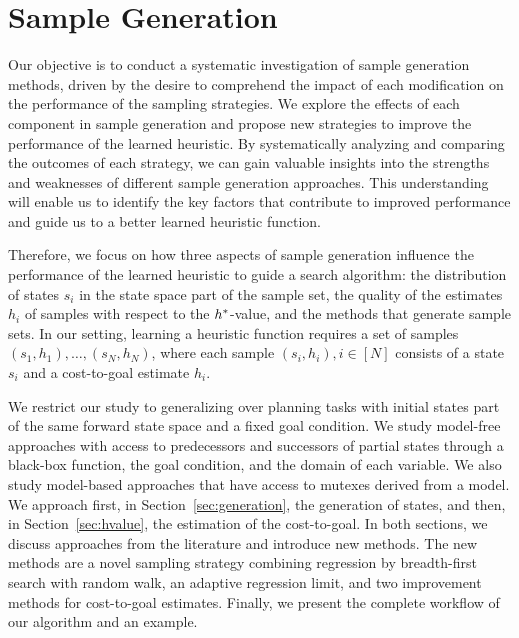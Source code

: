 \chapter{Sample Generation}
\label{sec:sampling}

Our objective is to conduct a systematic investigation of sample generation methods, driven by the desire to comprehend the impact of each modification on the performance of the sampling strategies. We explore the effects of each component in sample generation and propose new strategies to improve the performance of the learned heuristic. By systematically analyzing and comparing the outcomes of each strategy, we can gain valuable insights into the strengths and weaknesses of different sample generation approaches. This understanding will enable us to identify the key factors that contribute to improved performance and guide us to a better learned heuristic function.

Therefore, we focus on how three aspects of sample generation influence the performance of the learned heuristic to guide a search algorithm: the distribution of states $s_i$ in the state space part of the sample set, the quality of the estimates $h_i$ of samples with respect to the $h^{*}$-value, and the methods that generate sample sets. In our setting, learning a heuristic function requires a set of samples $(s_1,h_1),\ldots,(s_N,h_N)$, where each sample $(s_i,h_i), i\in[N]$ consists of a state $s_i$ and a cost-to-goal estimate $h_i$.

We restrict our study to generalizing over planning tasks with initial states part of the same forward state space and a fixed goal condition. We study model-free approaches with access to predecessors and successors of partial states through a black-box function, the goal condition, and the domain of each variable. We also study model-based approaches that have access to mutexes derived from a \sas model. We approach first, in Section~\ref{sec:generation}, the generation of states, and then, in Section~\ref{sec:hvalue}, the estimation of the cost-to-goal. In both sections, we discuss approaches from the literature and introduce new methods. The new methods are a novel sampling strategy combining regression by breadth-first search with random walk, an adaptive regression limit, and two improvement methods for cost-to-goal estimates. Finally, we present the complete workflow of our algorithm and an example.


